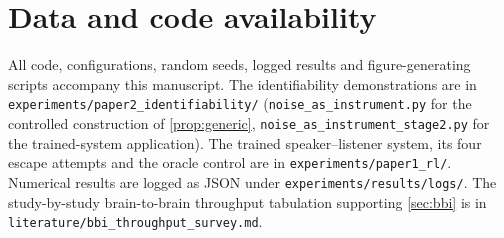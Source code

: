 \documentclass[11pt,a4paper]{article}
\theoremstyle{plain}
\theoremstyle{definition}
\theoremstyle{remark}
\newcommand{\code}[1]{\texttt{\small #1}}
\begin{document}
\section*{Data and code availability}

All code, configurations, random seeds, logged results and figure-generating scripts accompany this manuscript.
The identifiability demonstrations are in \code{experiments/paper2\_identifiability/} (\code{noise\_as\_instrument.py}
for the controlled construction of \cref{prop:generic}, \code{noise\_as\_instrument\_stage2.py} for the trained-system
application). The trained speaker--listener system, its four escape attempts and the oracle control are in
\code{experiments/paper1\_rl/}. Numerical results are logged as JSON under \code{experiments/results/logs/}. The
study-by-study brain-to-brain throughput tabulation supporting \cref{sec:bbi} is in
\code{literature/bbi\_throughput\_survey.md}.


\end{document}
